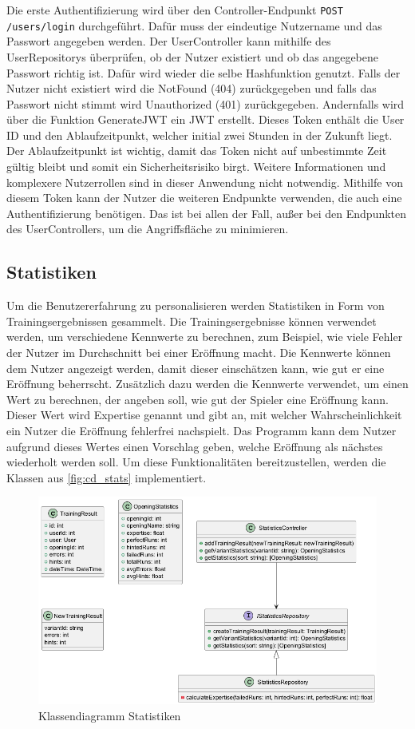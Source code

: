 Die erste Authentifizierung wird über den Controller-Endpunkt \lstinline{POST /users/login} durchgeführt. Dafür muss der eindeutige Nutzername und das Passwort angegeben werden. Der UserController kann mithilfe des UserRepositorys überprüfen, ob der Nutzer existiert und ob das angegebene Passwort richtig ist. Dafür wird wieder die selbe Hashfunktion genutzt.
Falls der Nutzer nicht existiert wird die NotFound (404) zurückgegeben und falls das Passwort nicht stimmt wird Unauthorized (401) zurückgegeben.
Andernfalls wird über die Funktion GenerateJWT ein \ac{JWT} erstellt. Dieses Token enthält die User ID und den Ablaufzeitpunkt, welcher initial zwei Stunden in der Zukunft liegt. Der Ablaufzeitpunkt ist wichtig, damit das Token nicht auf unbestimmte Zeit gültig bleibt und somit ein Sicherheitsrisiko birgt. Weitere Informationen und komplexere Nutzerrollen sind in dieser Anwendung nicht notwendig. Mithilfe von diesem Token kann der Nutzer die weiteren Endpunkte verwenden, die auch eine Authentifizierung benötigen. Das ist bei allen der Fall, außer bei den Endpunkten des UserControllers, um die Angriffsfläche zu minimieren.

\subsection{Statistiken}
Um die Benutzererfahrung zu personalisieren werden Statistiken in Form von Trainingsergebnissen gesammelt. Die Trainingsergebnisse können verwendet werden, um verschiedene Kennwerte zu berechnen, zum Beispiel, wie viele Fehler der Nutzer im Durchschnitt bei einer Eröffnung macht. Die Kennwerte können dem Nutzer angezeigt werden, damit dieser einschätzen kann, wie gut er eine Eröffnung beherrscht. Zusätzlich dazu werden die Kennwerte verwendet, um einen Wert zu berechnen, der angeben soll, wie gut der Spieler eine Eröffnung kann. Dieser Wert wird Expertise genannt und gibt an, mit welcher Wahrscheinlichkeit ein Nutzer die Eröffnung fehlerfrei nachspielt. Das Programm kann dem Nutzer aufgrund dieses Wertes einen Vorschlag geben, welche Eröffnung als nächstes wiederholt werden soll. Um diese Funktionalitäten bereitzustellen, werden die Klassen aus \autoref{fig:cd_stats} implementiert.

\begin{figure}[h]
    \includegraphics[width=\linewidth]{images/diagrams/stats.png}
    \caption{Klassendiagramm Statistiken}
    \label{fig:cd_stats}
\end{figure}


